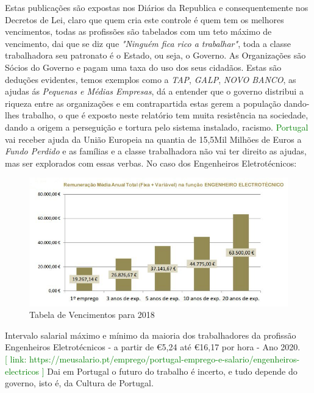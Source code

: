 Estas publicações são expostas nos Diários da Republica e consequentemente nos Decretos de Lei, claro que quem cria este controle é quem tem os melhores vencimentos, todas as profissões são tabelados com um teto máximo de vencimento, dai que se diz que \textit{"Ninguém fica rico a trabalhar"}, toda a classe trabalhadora seu patronato é o Estado, ou seja, o Governo. As Organizações são Sócios do Governo e pagam uma taxa do uso dos seus cidadãos. Estas são deduções evidentes, temos exemplos como a \textit{TAP}, \textit{GALP}, \textit{NOVO BANCO}, as ajudas ás \textit{Pequenas e Médias Empresas}, dá a entender que o governo distribui a riqueza entre as organizações e em contrapartida estas gerem a população dando-lhes trabalho, o que é exposto neste relatório tem muita resistência na sociedade, dando a origem a perseguição e tortura pelo sistema instalado, racismo. \textcolor{green}{Portugal} vai receber ajuda da União Europeia na quantia de 15,5Mil Milhões de Euros a \textit{Fundo Perdido} e as famílias e a classe trabalhadora não vai ter direito as ajudas, mas ser explorados com essas verbas.
\newpage
No caso dos Engenheiros Eletrotécnicos:\\
\begin{figure}[H]
	\centering
	\includegraphics[scale=0.52]{./image/Salary/Eng_Elec.jpg}
	\caption{Tabela de Vencimentos para 2018 \cite{article-3}}
\end{figure}
Intervalo salarial máximo e mínimo da maioria dos trabalhadores da profissão Engenheiros Eletrotécnicos - a partir de \euro 5,24 até \euro 16,17 por hora - Ano 2020. \\
\textcolor{green}{[ link: \quad  https://meusalario.pt/emprego/portugal-emprego-e-salario/engenheiros-electricos ]}
\emptyline
Dai em Portugal o futuro do trabalho é incerto, e tudo depende do governo, isto é, da Cultura de Portugal.
\newpage
